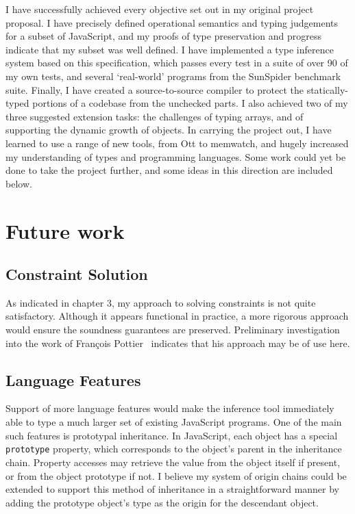 \documentclass[12pt,a4paper,twoside,openright]{report}
\theoremstyle{definition}
\theoremstyle{dotless}
\newcommand*{\js}{\texttt}
\begin{document}
I have successfully achieved every objective set out in my original project
proposal.  I have precisely defined operational semantics and typing judgements
for a subset of JavaScript, and my proofs of type preservation and progress
indicate that my subset was well defined.  I have implemented a type inference
system based on this specification, which passes every test in a suite of over
90 of my own tests, and several `real-world' programs from the SunSpider
benchmark suite. Finally, I have created a source-to-source compiler to
protect the statically-typed portions of a codebase from the unchecked parts. I
also achieved two of my three suggested extension tasks: the challenges of
typing arrays, and of supporting the dynamic growth of objects. In carrying the
project out, I have learned to use a range of new tools, from Ott to memwatch,
and hugely increased my understanding of types and programming languages. Some
work could yet be done to take the project further, and some ideas in this
direction are included below.

\section{Future work}

\subsection{Constraint Solution}
As indicated in chapter 3, my approach to solving constraints is not quite satisfactory. 
Although it appears functional in practice, a more rigorous approach would ensure the
soundness guarantees are preserved. Preliminary investigation into the work of
Fran\c{c}ois Pottier~\cite{pottier1998type} indicates that his approach may be of use here.

\subsection{Language Features}

Support of more language features would make the inference tool immediately
able to type a much larger set of existing JavaScript programs. One of the main
such features is prototypal inheritance. In JavaScript, each object has a
special \js{prototype} property, which corresponds to the object's parent in
the inheritance chain. Property accesses may retrieve the value from the
object itself if present, or from the object prototype if not. I believe my 
system of origin chains could be extended to support this method of inheritance 
in a straightforward manner by adding the prototype object's type as the origin
for the descendant object.
\end{document}
